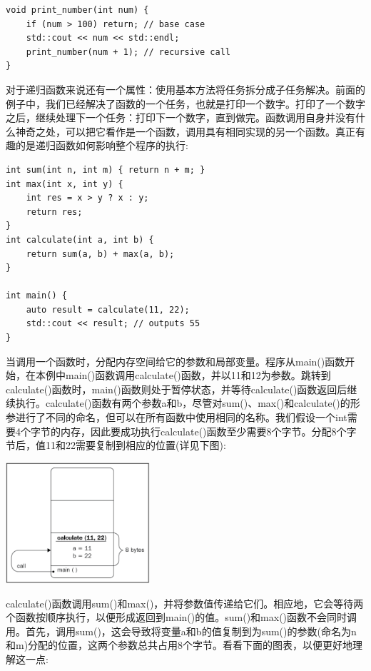 \begin{lstlisting}[caption={}]
void print_number(int num) {
	if (num > 100) return; // base case
	std::cout << num << std::endl;
	print_number(num + 1); // recursive call
}
\end{lstlisting}

对于递归函数来说还有一个属性：使用基本方法将任务拆分成子任务解决。前面的例子中，我们已经解决了函数的一个任务，也就是打印一个数字。打印了一个数字之后，继续处理下一个任务：打印下一个数字，直到做完。函数调用自身并没有什么神奇之处，可以把它看作是一个函数，调用具有相同实现的另一个函数。真正有趣的是递归函数如何影响整个程序的执行:  \par

\begin{lstlisting}[caption={}]
int sum(int n, int m) { return n + m; }
int max(int x, int y) {
	int res = x > y ? x : y;
	return res;
}
int calculate(int a, int b) {
	return sum(a, b) + max(a, b);
}

int main() {
	auto result = calculate(11, 22);
	std::cout << result; // outputs 55
}
\end{lstlisting}

当调用一个函数时，分配内存空间给它的参数和局部变量。程序从main()函数开始，在本例中main()函数调用calculate()函数，并以11和12为参数。跳转到calculate()函数时，main()函数则处于暂停状态，并等待calculate()函数返回后继续执行。calculate()函数有两个参数a和b，尽管对sum()、max()和calculate()的形参进行了不同的命名，但可以在所有函数中使用相同的名称。我们假设一个int需要4个字节的内存，因此要成功执行calculate()函数至少需要8个字节。分配8个字节后，值11和22需要复制到相应的位置(详见下图):

\begin{center}
	\includegraphics[width=0.4\textwidth]{content/Section-1/Chapter-2/1}
\end{center}

calculate()函数调用sum()和max()，并将参数值传递给它们。相应地，它会等待两个函数按顺序执行，以便形成返回到main()的值。sum()和max()函数不会同时调用。首先，调用sum()，这会导致将变量a和b的值复制到为sum()的参数(命名为n和m)分配的位置，这两个参数总共占用8个字节。看看下面的图表，以便更好地理解这一点: \par

